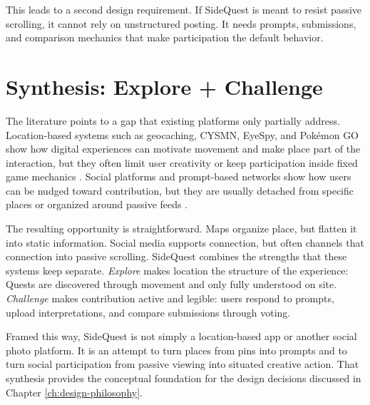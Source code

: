\documentclass[12pt,a4paper,oneside]{report}
\begin{document}
This leads to a second design requirement. If SideQuest is meant to resist passive scrolling, it cannot rely on unstructured posting. It needs prompts, submissions, and comparison mechanics that make participation the default behavior.

\section{Synthesis: Explore + Challenge}
The literature points to a gap that existing platforms only partially address. Location-based systems such as geocaching, CYSMN, EyeSpy, and Pokémon GO show how digital experiences can motivate movement and make place part of the interaction, but they often limit user creativity or keep participation inside fixed game mechanics \cite{Geocaching,CYSMN,Eyespy,Pokemon}. Social platforms and prompt-based networks show how users can be nudged toward contribution, but they are usually detached from specific places or organized around passive feeds \cite{Viral,BeReal,BerealTourism}.

The resulting opportunity is straightforward. Maps organize place, but flatten it into static information. Social media supports connection, but often channels that connection into passive scrolling. SideQuest combines the strengths that these systems keep separate. \textit{Explore} makes location the structure of the experience: Quests are discovered through movement and only fully understood on site. \textit{Challenge} makes contribution active and legible: users respond to prompts, upload interpretations, and compare submissions through voting.

Framed this way, SideQuest is not simply a location-based app or another social photo platform. It is an attempt to turn places from pins into prompts and to turn social participation from passive viewing into situated creative action. That synthesis provides the conceptual foundation for the design decisions discussed in Chapter \ref{ch:design-philosophy}.

\end{document}
